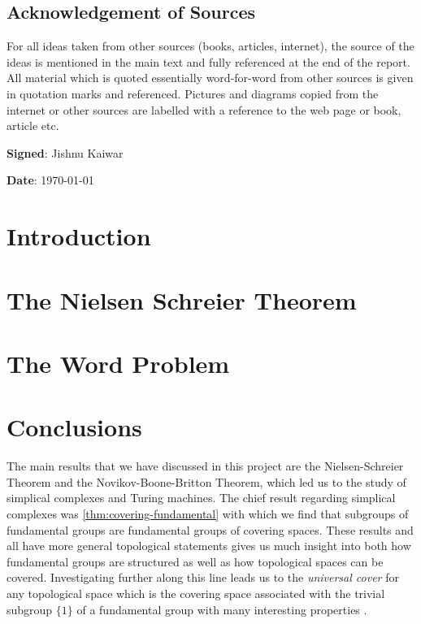 \documentclass[12pt]{report}
\theoremstyle{definition}
\numberwithin{equation}{theorem}
\begin{document}


\newpage
\section*{Acknowledgement of Sources}

For all ideas taken from other sources (books, articles, internet),
the source of the ideas is mentioned in the main text and fully
referenced at the end of the report.
All material which is quoted essentially word-for-word from
other sources is given in quotation marks and referenced.
Pictures and diagrams copied from the internet or other sources
are labelled with a reference to the web page or book, article etc.

\textbf{Signed}: Jishnu Kaiwar

\textbf{Date}: \today


\tableofcontents

\chapter{Introduction}
\label{chap:intro}


\chapter{The Nielsen Schreier Theorem}
\label{chap:ns}


\chapter{The Word Problem}
\label{chap:wp}


\chapter{Conclusions}
\label{chap:conc}

The main results that we have discussed in this project are the Nielsen-Schreier Theorem and the Novikov-Boone-Britton Theorem, which led us to the study of simplical complexes and Turing machines. The chief result regarding simplical complexes was \ref{thm:covering-fundamental} with which we find that subgroups of fundamental groups are fundamental groups of covering spaces. These results and all have more general topological statements gives us much insight into both how fundamental groups are structured as well as how topological spaces can be covered. Investigating further along this line leads us to the \emph{universal cover} for any topological space which is the covering space associated with the trivial subgroup $\{ 1 \}$ of a fundamental group with many interesting properties \cite{hatcher2002AT}.
\end{document}
